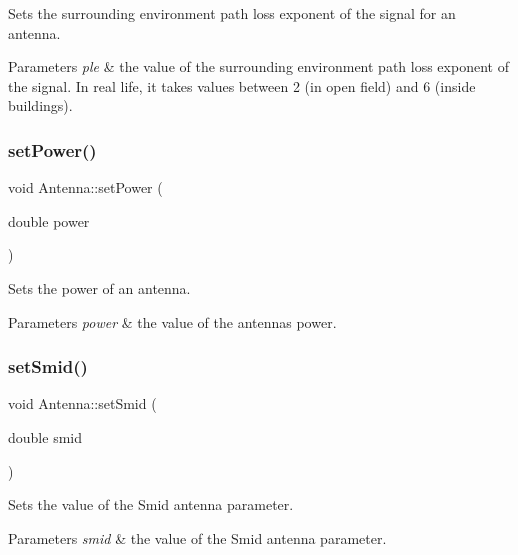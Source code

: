 Sets the surrounding environment\textquotesingle{} path loss exponent of the signal for an antenna. 
\begin{DoxyParams}{Parameters}
{\em ple} & the value of the surrounding environment\textquotesingle{} path loss exponent of the signal. In real life, it takes values between 2 (in open field) and 6 (inside buildings). \\
\hline
\end{DoxyParams}
\mbox{\label{class_antenna_a172a4c7765dea045d6504f6e2cbe0f59}} 
\subsubsection{\texorpdfstring{setPower()}{setPower()}}
{\footnotesize\ttfamily void Antenna\+::set\+Power (\begin{DoxyParamCaption}\item[{double}]{power }\end{DoxyParamCaption})}

Sets the power of an antenna. 
\begin{DoxyParams}{Parameters}
{\em power} & the value of the antenna\textquotesingle{}s power. \\
\hline
\end{DoxyParams}
\mbox{\label{class_antenna_a67e5ae0106189d18e4f114d8e0e14a09}} 
\subsubsection{\texorpdfstring{setSmid()}{setSmid()}}
{\footnotesize\ttfamily void Antenna\+::set\+Smid (\begin{DoxyParamCaption}\item[{double}]{smid }\end{DoxyParamCaption})}

Sets the value of the Smid antenna parameter. 
\begin{DoxyParams}{Parameters}
{\em smid} & the value of the Smid antenna parameter. \\
\hline
\end{DoxyParams}
\mbox{\label{class_antenna_a92357bee36ba7dcfd08c4d2ce2280e3c}} 
